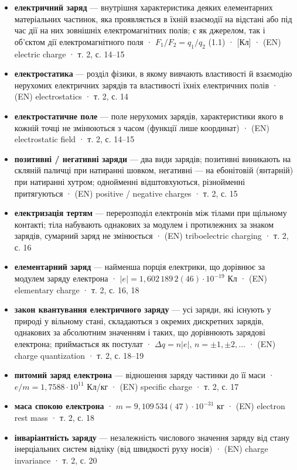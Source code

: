 \documentclass[11pt,a4paper,oneside]{book}
\newcommand{\book}{}
\begin{document}
\begin{itemize}
\item \textbf{електричний заряд} — внутрішня характеристика деяких елементарних матеріальних частинок, яка проявляється в їхній взаємодії на відстані або під час дії на них зовнішніх електромагнітних полів; є як джерелом, так і об'єктом дії електромагнітного поля · $F_1/F_2 = q_1/q_2$ (1.1) · [Кл] · (EN) electric charge · \book{} т. 2, с. 14–15
\item \textbf{електростатика} — розділ фізики, в якому вивчають властивості й взаємодію нерухомих електричних зарядів та властивості їхніх електричних полів · (EN) electrostatics · \book{} т. 2, с. 14
\item \textbf{електростатичне поле} — поле нерухомих зарядів, характеристики якого в кожній точці не змінюються з часом (функції лише координат) · (EN) electrostatic field · \book{} т. 2, с. 14–15
\item \textbf{позитивні / негативні заряди} — два види зарядів; позитивні виникають на скляній паличці при натиранні шовком, негативні — на ебонітовій (янтарній) при натиранні хутром; однойменні відштовхуються, різнойменні притягуються · (EN) positive / negative charges · \book{} т. 2, с. 15
\item \textbf{електризація тертям} — перерозподіл електронів між тілами при щільному контакті; тіла набувають однакових за модулем і протилежних за знаком зарядів, сумарний заряд не змінюється · (EN) triboelectric charging · \book{} т. 2, с. 16
\item \textbf{елементарний заряд} — найменша порція електрики, що дорівнює за модулем заряду електрона · $|e| = 1{,}602\,189\,2(46)\cdot10^{-19}$ Кл · (EN) elementary charge · \book{} т. 2, с. 16, 18
\item \textbf{закон квантування електричного заряду} — усі заряди, які існують у природі у вільному стані, складаються з окремих дискретних зарядів, однакових за абсолютним значенням і таких, що дорівнюють зарядові електрона; приймається як постулат · $\Delta q = n|e|$, $n = \pm1, \pm2, \ldots$ · (EN) charge quantization · \book{} т. 2, с. 18–19
\item \textbf{питомий заряд електрона} — відношення заряду частинки до її маси · $e/m = 1{,}7588\cdot10^{11}$ Кл/кг · (EN) specific charge · \book{} т. 2, с. 17
\item \textbf{маса спокою електрона} · $m = 9{,}109\,534(47)\cdot10^{-31}$ кг · (EN) electron rest mass · \book{} т. 2, с. 18
\item \textbf{інваріантність заряду} — незалежність числового значення заряду від стану інерціальних систем відліку (від швидкості руху носія) · (EN) charge invariance · \book{} т. 2, с. 20

\end{itemize}
\end{document}

